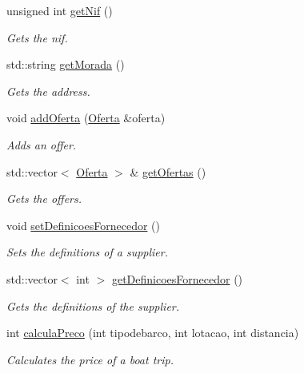 \begin{DoxyCompactItemize}
unsigned int \hyperlink{classFornecedor_aec536b071f628fc1aa468071fa5a6067}{get\+Nif} ()
\begin{DoxyCompactList}\small\item\em Gets the nif. \end{DoxyCompactList}\item 
std\+::string \hyperlink{classFornecedor_ae71fba3a196f749f54956fdbb25ede6a}{get\+Morada} ()
\begin{DoxyCompactList}\small\item\em Gets the address. \end{DoxyCompactList}\item 
void \hyperlink{classFornecedor_a220373fd19f44a30d7c6c1ec913be700}{add\+Oferta} (\hyperlink{classOferta}{Oferta} \&oferta)
\begin{DoxyCompactList}\small\item\em Adds an offer. \end{DoxyCompactList}\item 
std\+::vector$<$ \hyperlink{classOferta}{Oferta} $>$ \& \hyperlink{classFornecedor_a7ef7f5f79e2c61aaca5d60c06b2a0051}{get\+Ofertas} ()
\begin{DoxyCompactList}\small\item\em Gets the offers. \end{DoxyCompactList}\item 
\mbox{\label{classFornecedor_a0a0945cbd2fd120d9eab5d5aec441b72}} 
void \hyperlink{classFornecedor_a0a0945cbd2fd120d9eab5d5aec441b72}{set\+Definicoes\+Fornecedor} ()
\begin{DoxyCompactList}\small\item\em Sets the definitions of a supplier. \end{DoxyCompactList}\item 
std\+::vector$<$ int $>$ \hyperlink{classFornecedor_a94de4f30aa8328ce58dc1a8ec18e24c2}{get\+Definicoes\+Fornecedor} ()
\begin{DoxyCompactList}\small\item\em Gets the definitions of the supplier. \end{DoxyCompactList}\item 
int \hyperlink{classFornecedor_a977992e1dd6370a599e730d9883be277}{calcula\+Preco} (int tipodebarco, int lotacao, int distancia)
\begin{DoxyCompactList}\small\item\em Calculates the price of a boat trip. \end{DoxyCompactList}\item 

\end{DoxyCompactItemize}
